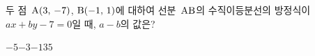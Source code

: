 두 점~$\mathrm{A}(3,\mkern3mu -7)$, $\mathrm{B}(-1,\mkern3mu 1)$에 대하여 선분~$\mathrm{AB}$의 수직이등분선의 방정식이 $ax+by-7=0$일 때, $a-b$의 값은? 
\begin{choices32}{$-5$}{$-3$}{$-1$}{$3$}{$5$}\end{choices32}
